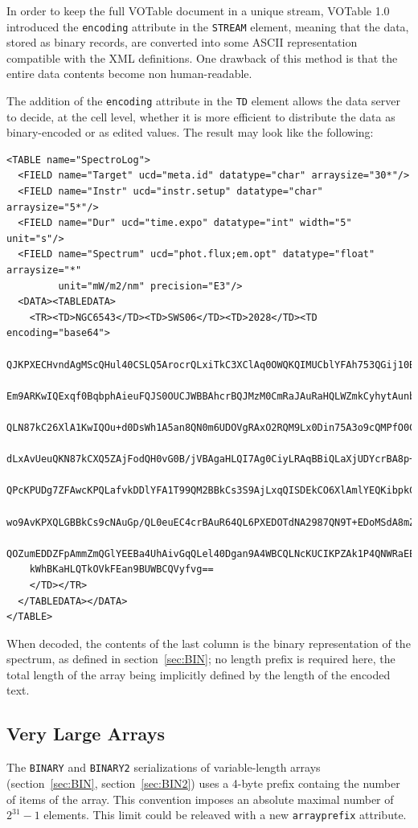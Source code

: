 \documentclass[11pt,a4paper]{ivoa}
\def\Aref#1{section~\ref{#1}}
\let\fg=\color
\def\attr#1{{\tt{\fg{DarkRed}#1}}}
\def\elem#1{{\tt{\fg{DarkRed}#1}}}
\begin{document}
{{{In order to keep the full VOTable document in a unique stream,
VOTable 1.0 introduced the \attr{encoding} attribute in the
\elem{STREAM} element, meaning that the data, stored as binary records,
are converted into some ASCII representation compatible with the
XML definitions. One drawback of this method is that the entire data
contents become non human-readable.

The addition of the \attr{encoding} attribute in the \elem{TD} element
allows the data server to decide, at the cell level, whether it is more
efficient to distribute the data as binary-encoded or as edited
values. The result may look like the following:

\begin{verbatim}
<TABLE name="SpectroLog">
  <FIELD name="Target" ucd="meta.id" datatype="char" arraysize="30*"/>
  <FIELD name="Instr" ucd="instr.setup" datatype="char" arraysize="5*"/>
  <FIELD name="Dur" ucd="time.expo" datatype="int" width="5" unit="s"/>
  <FIELD name="Spectrum" ucd="phot.flux;em.opt" datatype="float" arraysize="*"
         unit="mW/m2/nm" precision="E3"/>
  <DATA><TABLEDATA>
    <TR><TD>NGC6543</TD><TD>SWS06</TD><TD>2028</TD><TD encoding="base64">
    QJKPXECHvndAgMScQHul40CSLQ5ArocrQLxiTkC3XClAq0OWQKQIMUCblYFAh753QGij10BT
    Em9ARKwIQExqf0BqbphAieuFQJS0OUCJWBBAhcrBQJMzM0CmRaJAuRaHQLWZmkCyhytAunbJ
    QLN87kC26XlA1KwIQOu+d0DsWh1A5an8QN0m6UDOVgRAxO2RQM9Lx0Din75A3o9cQMPfO0C/
    dLxAvUeuQKN87kCXQ5ZAjFodQH0vG0B/jVBAgaHLQI7Ag0CiyLRAqBBiQLaXjUDYcrBA8p++
    QPcKPUDg7ZFAwcKPQLafvkDDlYFA1T99QM2BBkCs3S9AjLxqQISDEkCO6XlAmlYEQKibpkC5
    wo9AvKPXQLGBBkCs9cNAuGp/QL0euEC4crBAuR64QL6PXEDOTdNA2987QN9T+EDoMSdA8mZm
    QOZumEDDZFpAmmZmQGlYEEBa4UhAivGqQLel40Dgan9A4WBCQLNcKUCIKPZAk1P4QNWRaEEP
    kWhBKaHLQTkOVkFEan9BUWBCQVyfvg==
    </TD></TR>
  </TABLEDATA></DATA>
</TABLE>
\end{verbatim}
\par

\noindent
When decoded, the contents of the last column is the binary representation
of the spectrum, as defined in \Aref{sec:BIN};
no length prefix is required here, the total length of the array being
implicitly defined by the length of the encoded text.

\subsection{Very Large Arrays}
The \elem{BINARY} and \elem{BINARY2} serializations of variable-length arrays
(\Aref{sec:BIN}, \Aref{sec:BIN2}) uses a 4-byte prefix containg the number of
items of the array. This convention imposes an absolute maximal
number of $2^{31}-1$ elements. This limit could be releaved
with a new \attr{arrayprefix} attribute.

}}}
\end{document}
